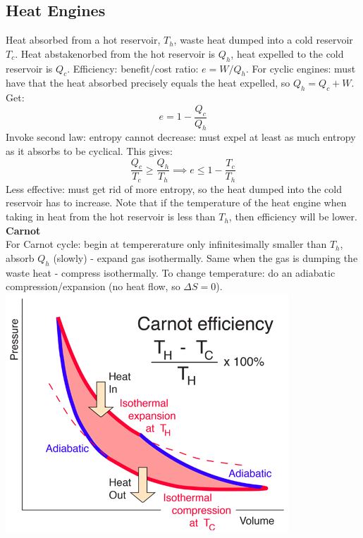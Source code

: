 \documentclass[a4paper,norsk, 10pt]{article}
\begin{document}
\subsection{Heat Engines}
Heat absorbed from a hot reservoir, $T_h$, waste heat dumped into a cold reservoir $T_c$. Heat abstakenorbed from the hot reservoir is $Q_h$, heat expelled to the cold reservoir is $Q_c$. Efficiency: benefit/cost ratio: $e=W/Q_h$. For cyclic engines: must have that the heat absorbed precisely equals the heat expelled, so $Q_h=Q_c+W$. Get:
\begin{equation}
e=1-\frac{Q_c}{Q_h}
\end{equation}
Invoke second law: entropy cannot decrease: must expel at least as much entropy as it absorbs to be cyclical. This gives:
\begin{equation}
\frac{Q_c}{T_c}\geq \frac{Q_h}{T_h} \implies e \leq 1-\frac{T_c}{T_h}
\end{equation}
Less effective: must get rid of more entropy, so the heat dumped into the cold reservoir has to increase. Note that if the temperature of the heat engine when taking in heat from the hot reservoir is less than $T_h$, then efficiency will be lower.\\
\textbf{Carnot}\\
For Carnot cycle: begin at tempererature only infinitesimally smaller than $T_h$, absorb $Q_h$ (slowly) - expand gas isothermally. Same when the gas is dumping the waste heat - compress isothermally. To change temperature: do an adiabatic compression/expansion (no heat flow,  so $\Delta S=0$).
\includegraphics[scale=0.5]{carnot.png}
\end{document}
